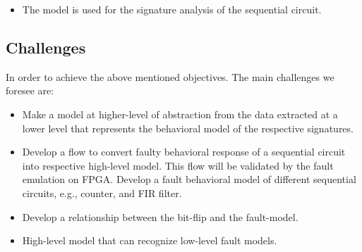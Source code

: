 \begin{itemize}
\item The model is used for the signature analysis of the sequential circuit.



%
%
%
%
%


\end{itemize}


\subsection{Challenges}
In order to achieve the above mentioned objectives. The main challenges we foresee are:
\begin{itemize}
\item Make a model at higher-level of abstraction from the data extracted at a lower level that represents the behavioral model of the respective signatures.
\item Develop a flow to convert faulty behavioral response of a sequential circuit into respective high-level model. This flow will be validated by the fault emulation on FPGA. Develop a  fault behavioral model of different sequential circuits, e.g., counter, and FIR filter.
\item Develop a relationship between the bit-flip and the fault-model.
\item High-level model that can recognize low-level fault models.
\end{itemize}


